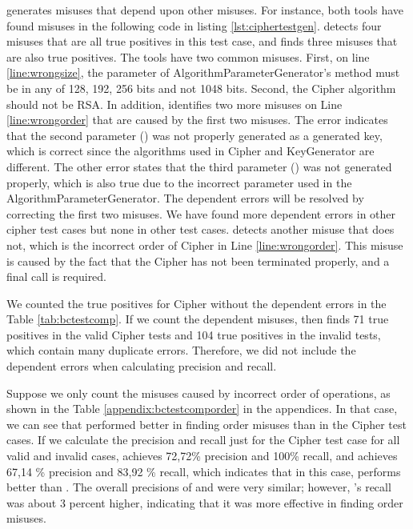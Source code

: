 \cognicryptsast{} generates misuses that depend upon other misuses.
For instance, both tools have found misuses in the following code in listing \ref{lst:ciphertestgen}. \cognicryptsast{} detects four misuses that are all true positives in this test case, and \codyze{} finds three misuses that are also true positives.
The tools have two common misuses. First, on line \ref{line:wrongsize}, the parameter of AlgorithmParameterGenerator's  method must be in any of 128, 192, 256 bits and not 1048 bits. Second, the Cipher algorithm should not be RSA. In addition, \cognicryptsast{} identifies two more misuses on Line \ref{line:wrongorder} that are caused by the first two misuses. The error indicates that the second parameter () was not properly generated as a generated key, which is correct since the algorithms used in Cipher and KeyGenerator are different. The other error states that the third parameter () was not generated properly, which is also true due to the incorrect parameter used in the AlgorithmParameterGenerator. The dependent errors will be resolved by correcting the first two misuses. We have found more dependent errors in other cipher test cases but none in other test cases. \codyze{} detects another misuse that \cognicryptsast{} does not, which is the incorrect order of Cipher in Line \ref{line:wrongorder}. This misuse is caused by the fact that the Cipher has not been terminated properly, and a final call is required.


We counted the true positives for Cipher without the dependent errors in the Table \ref{tab:bctestcomp}. If we count the dependent misuses, then \cognicryptsast{} finds 71 true positives in the valid Cipher tests and 104 true positives in the invalid tests, which contain many duplicate errors. Therefore, we did not include the dependent errors when calculating precision and recall.

Suppose we only count the misuses caused by incorrect order of operations, as shown in the Table \ref{appendix:bctestcomporder} in the appendices. In that case, we can see that \codyze{} performed better in finding order misuses than \cognicryptsast{} in the Cipher test cases. If we calculate the precision and recall just for the Cipher test case for all valid and invalid cases, \codyze{} achieves 72,72\% precision and 100\% recall, and \cognicryptsast{} achieves 67,14 \% precision and 83,92 \% recall, which indicates that in this case, \codyze{} performs better than \cognicryptsast. The overall precisions of \cognicryptsast{} and \codyze{} were very similar; however, \codyze's recall was about 3 percent higher, indicating that it was more effective in finding order misuses.


